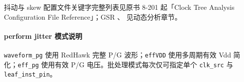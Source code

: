 \begin{seeAlsoBox}
抖动与 skew 配置文件关键字完整列表见原书 8-201 起「Clock Tree Analysis Configuration File Reference」；GSR 、 见动态分析章节。
\end{seeAlsoBox}

\paragraph{perform jitter 模式说明}
\texttt{waveform\_pg} 使用 RedHawk 完整 P/G 波形；\texttt{effVDD} 使用多周期有效 Vdd 简化；\texttt{eff\_pg} 使用有效 P/G 电压。批处理模式每次仅可指定单个 \texttt{clk\_src} 与 \texttt{leaf\_inst\_pin}。

